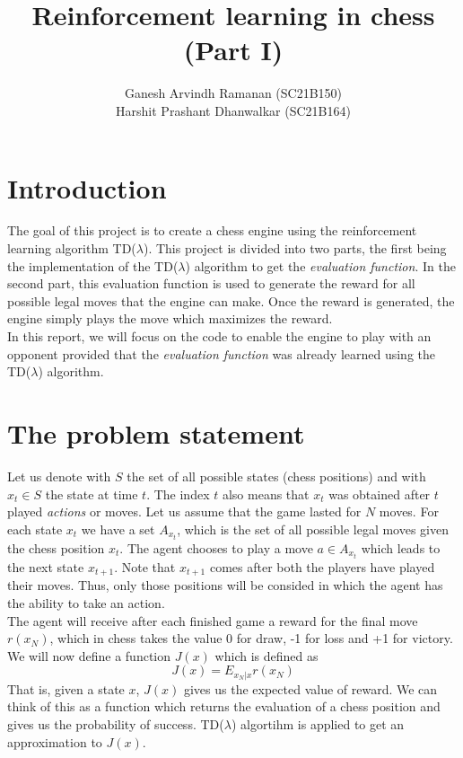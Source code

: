 \documentclass[11pt]{article}
\title{Reinforcement learning in chess (Part I)}
\author{Ganesh Arvindh Ramanan (SC21B150) \\ Harshit Prashant Dhanwalkar (SC21B164)}
\begin{document}
\maketitle

\section{Introduction}
The goal of this project is to create a chess engine using the reinforcement learning algorithm TD($\lambda$). This project is divided into two parts, the first being the implementation of the TD($\lambda$) algorithm to get the \emph{evaluation function}. In the second part, this evaluation function is used to generate the reward for all possible legal moves that the engine can make. Once the reward is generated, the engine simply plays the move which maximizes the reward. \\

\noindent In this report, we will focus on the code to enable the engine to play with an opponent provided that the \emph{evaluation function} was already learned using the TD($\lambda$) algorithm.

\section{The problem statement}
Let us denote with $S$ the set of all possible states (chess positions) and with $x_{t} \in S$ the state at time $t$. The index $t$ also means that $x_{t}$ was obtained after $t$ played \emph{actions} or moves. Let us assume that the game lasted for $N$ moves. For each state $x_{t}$ we have a set $A_{x_{t}}$, which is the set of all possible legal moves given the chess position $x_{t}$. The agent chooses to play a move $a \in A_{x_{t}}$ which leads to the next state $x_{t+1}$. Note that $x_{t+1}$ comes after both the players have played their moves. Thus, only those positions will be consided in which the agent has the ability to take an action. \\ 

\noindent The agent will receive after each finished game a reward for the final move $r(x_{N})$, which in chess takes the value 0 for draw, -1 for loss and +1 for victory. We will now define a function $J(x)$ which is defined as 
\[
    J(x) = E_{x_{N}|x}r(x_{N})
\]
That is, given a state $x$, $J(x)$ gives us the expected value of reward. We can think of this as a function which returns the evaluation of a chess position and gives us the probability of success. TD($\lambda$) algortihm is applied to get an approximation to $J(x)$. 
\end{document}

